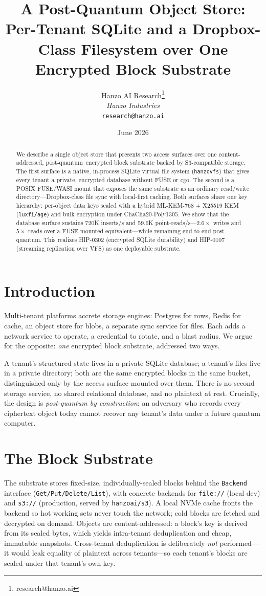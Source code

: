 \documentclass[11pt,twocolumn]{article}
\title{A Post-Quantum Object Store: Per-Tenant SQLite and a Dropbox-Class Filesystem over One Encrypted Block Substrate}
\author{Hanzo AI Research\thanks{research@hanzo.ai} \\ \textit{Hanzo Industries} \\ \texttt{research@hanzo.ai}}
\date{June 2026}
\begin{document}
\hanzocoverpage

\begin{abstract}
We describe a single object store that presents two access surfaces over one
content-addressed, post-quantum--encrypted block substrate backed by
S3-compatible storage. The first surface is a native, in-process SQLite virtual
file system (\texttt{hanzovfs}) that gives every tenant a private, encrypted
database without FUSE or cgo. The second is a POSIX FUSE/WASI mount that exposes
the same substrate as an ordinary read/write directory---Dropbox-class file sync
with local-first caching. Both surfaces share one key hierarchy: per-object data
keys sealed with a hybrid ML-KEM-768 + X25519 KEM (\texttt{luxfi/age}) and
bulk encryption under ChaCha20-Poly1305. We show that the database surface
sustains 720K inserts/s and 59.6K point-reads/s---$2.6\times$ writes and
$5\times$ reads over a FUSE-mounted equivalent---while remaining end-to-end
post-quantum. This realizes HIP-0302 (encrypted SQLite durability) and HIP-0107
(streaming replication over VFS) as one deployable substrate.
\end{abstract}

\section{Introduction}
Multi-tenant platforms accrete storage engines: Postgres for rows, Redis for
cache, an object store for blobs, a separate sync service for files. Each adds a
network service to operate, a credential to rotate, and a blast radius. We argue
for the opposite: \emph{one} encrypted block substrate, addressed two ways.

A tenant's structured state lives in a private SQLite database; a tenant's files
live in a private directory; both are the same encrypted blocks in the same
bucket, distinguished only by the access surface mounted over them. There is no
second storage service, no shared relational database, and no plaintext at rest.
Crucially, the design is \emph{post-quantum by construction}: an adversary who
records every ciphertext object today cannot recover any tenant's data under a
future quantum computer.

\section{The Block Substrate}
The substrate stores fixed-size, individually-sealed blocks behind the
\texttt{Backend} interface (\texttt{Get/Put/Delete/List}), with concrete
backends for \texttt{file://} (local dev) and \texttt{s3://} (production,
served by \texttt{hanzoai/s3}). A local NVMe cache fronts the backend so hot
working sets never touch the network; cold blocks are fetched and decrypted on
demand. Objects are content-addressed: a block's key is derived from its sealed
bytes, which yields intra-tenant deduplication and cheap, immutable snapshots.
Cross-tenant deduplication is deliberately \emph{not} performed---it would leak
equality of plaintext across tenants---so each tenant's blocks are sealed under
that tenant's own key.
\end{document}
